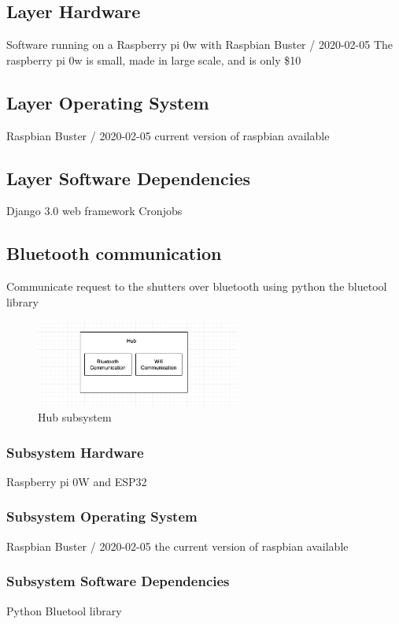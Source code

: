 \subsection{Layer Hardware}

Software running on a Raspberry pi 0w with Raspbian Buster / 2020-02-05
The raspberry pi 0w is small, made in large scale, and is only \$10

\subsection{Layer Operating System}
Raspbian Buster / 2020-02-05 current version of raspbian available

\subsection{Layer Software Dependencies}
Django 3.0 web framework
Cronjobs  

\subsection{Bluetooth communication}
Communicate request to the shutters over bluetooth using python the bluetool library

\begin{figure}[h!]
	\centering
 	\includegraphics[width=0.60\textwidth]{images/hub}
 \caption{Hub subsystem}
\end{figure}

\subsubsection{Subsystem Hardware}
Raspberry pi 0W and ESP32

\subsubsection{Subsystem Operating System}
Raspbian Buster / 2020-02-05 the current version of raspbian available

\subsubsection{Subsystem Software Dependencies}
Python Bluetool library

